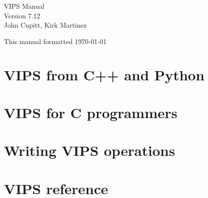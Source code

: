 \documentclass[a4paper,twocolumn,dvips]{book}
\begin{document}

\begin{titlepage}
\thispagestyle{empty}
\begin{center}
\huge
VIPS Manual\\
\large Version 7.12\\
\vspace{0.5in}
\large
John Cupitt,
Kirk Martinez\\
\end{center}

\vspace{6in}

This manual formatted \today
\setcounter{page}{1}
\end{titlepage}

\tableofcontents
\thispagestyle{plain}

\listoffigures
\thispagestyle{plain}

\listoftables
\thispagestyle{plain}

{}
\thispagestyle{plain}
\cfoot{}

\chapter{VIPS from C++ and Python}








\chapter{VIPS for C programmers}





\chapter{Writing VIPS operations}






\chapter{VIPS reference}



\end{document}
